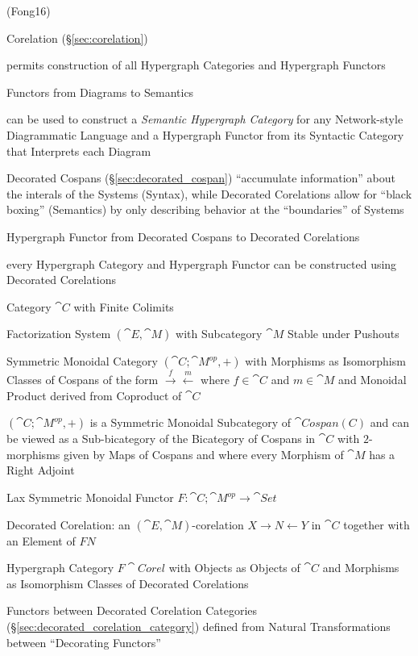(Fong16)

Corelation (\S\ref{sec:corelation})

permits construction of all Hypergraph Categories and Hypergraph
Functors

Functors from Diagrams to Semantics

can be used to construct a \emph{Semantic Hypergraph Category} for any
Network-style Diagrammatic Language and a Hypergraph Functor from its
Syntactic Category that Interprets each Diagram

Decorated Cospans (\S\ref{sec:decorated_cospan}) ``accumulate
information'' about the interals of the Systems (Syntax), while
Decorated Corelations allow for ``black boxing'' (Semantics) by only
describing behavior at the ``boundaries'' of Systems

Hypergraph Functor from Decorated Cospans to Decorated Corelations

every Hypergraph Category and Hypergraph Functor can be constructed
using Decorated Corelations

Category $\cat{C}$ with Finite Colimits

Factorization System $(\cat{E},\cat{M})$ with Subcategory $\cat{M}$
Stable under Pushouts

Symmetric Monoidal Category $(\cat{C};\cat{M}^{op}, +)$ with Morphisms
as Isomorphism Classes of Cospans of the form
$\xrightarrow{f}\xleftarrow{m}$ where $f \in \cat{C}$ and $m \in
\cat{M}$ and Monoidal Product derived from Coproduct of $\cat{C}$

$(\cat{C};\cat{M}^{op}, +)$ is a Symmetric Monoidal Subcategory of
$\cat{Cospan(C)}$ and can be viewed as a Sub-bicategory of the
Bicategory of Cospans in $\cat{C}$ with $2$-morphisms given by Maps of
Cospans and where every Morphism of $\cat{M}$ has a Right Adjoint

Lax Symmetric Monoidal Functor $F : \cat{C};\cat{M}^{op} \rightarrow
\cat{Set}$

Decorated Corelation: an $(\cat{E},\cat{M})$-corelation $X \rightarrow
N \leftarrow Y$ in $\cat{C}$ together with an Element of $F N$ %

Hypergraph Category $F\cat{Corel}$ with Objects as Objects of
$\cat{C}$ and Morphisms as Isomorphism Classes of Decorated
Corelations

Functors between Decorated Corelation Categories
(\S\ref{sec:decorated_corelation_category}) defined from Natural
Transformations between ``Decorating Functors'' %



